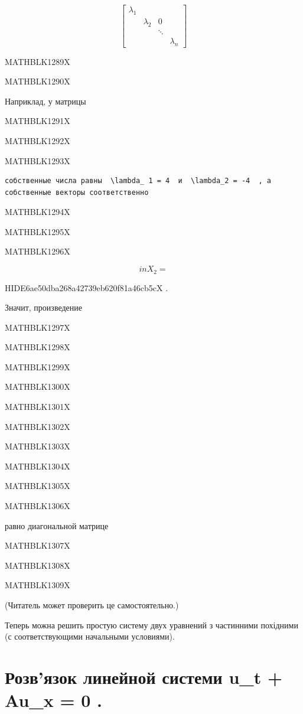 \documentclass[
  ukrainian,
]{article}
\begin{document}
\[
\begin{bmatrix} \lambda_1 & & & \\ & \lambda_2 & 0 & \\ & & \ddots & \\ & & & \lambda_n \end{bmatrix}
\]

MATHBLK1289X

MATHBLK1290X

Наприклад, у матрицы

MATHBLK1291X

MATHBLK1292X

MATHBLK1293X

\begin{verbatim}
собственные числа равны  \lambda_ 1 = 4  и  \lambda_2 = -4  , а собственные векторы соответственно
\end{verbatim}

MATHBLK1294X

MATHBLK1295X

MATHBLK1296X

\[
in  X_2 =
\]

HIDE6ae50dba268a42739eb620f81a46cb5cX .

Значит, произведение

MATHBLK1297X

MATHBLK1298X

MATHBLK1299X

MATHBLK1300X

MATHBLK1301X

MATHBLK1302X

MATHBLK1303X

MATHBLK1304X

MATHBLK1305X

MATHBLK1306X

равно диагональной матрице

MATHBLK1307X

MATHBLK1308X

MATHBLK1309X

(Читатель может проверить це самостоятельно.)

Теперь можна решить простую систему двух уравнений з частинними
похідними (с соответствующими начальными условиями).

\section{Розв'язок линейной системи u\_t + Au\_x = 0
.}\label{ux440ux43eux437ux432ux44fux437ux43eux43a-ux43bux438ux43dux435ux439ux43dux43eux439-ux441ux438ux441ux442ux435ux43cux438-u_t-au_x-0-.}
\end{document}
